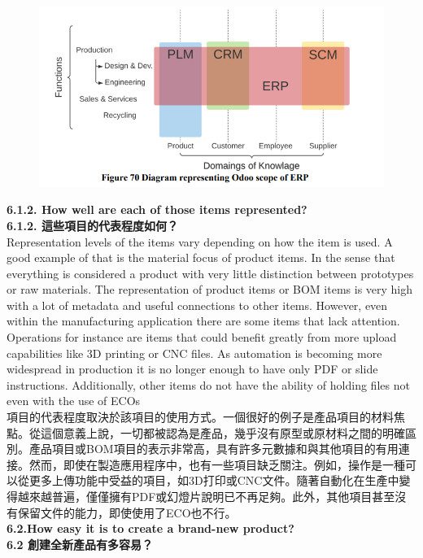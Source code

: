 \documentclass[12pt,a4paper]{report}  %
\begin{document}
\begin{figure}[htbp]
  \centering
  \includegraphics[]{image/601.png}
  \label{fig:601}
\end{figure}
    
\Large\textbf{6.1.2. How well are each of those items represented?}\\
\Large\textbf{6.1.2. 這些項目的代表程度如何？}\\

Representation levels of the items vary depending on how the item is used. A good 
example of that is the material focus of product items. In the sense that everything is 
considered a product with very little distinction between prototypes or raw materials. The 
representation of product items or BOM items is very high with a lot of metadata and useful 
connections to other items. However, even within the manufacturing application there are 
some items that lack attention. Operations for instance are items that could benefit greatly 
from more upload capabilities like 3D printing or CNC files. As automation is becoming 
more widespread in production it is no longer enough to have only PDF or slide instructions.
Additionally, other items do not have the ability of holding files not even with the use of 
ECOs\\
項目的代表程度取決於該項目的使用方式。一個很好的例子是產品項目的材料焦點。從這個意義上說，一切都被認為是產品，幾乎沒有原型或原材料之間的明確區別。產品項目或BOM項目的表示非常高，具有許多元數據和與其他項目的有用連接。然而，即使在製造應用程序中，也有一些項目缺乏關注。例如，操作是一種可以從更多上傳功能中受益的項目，如3D打印或CNC文件。隨著自動化在生產中變得越來越普遍，僅僅擁有PDF或幻燈片說明已不再足夠。此外，其他項目甚至沒有保留文件的能力，即使使用了ECO也不行。\\

\Large\textbf{6.2.How easy it is to create a brand-new product?}\\
\Large\textbf{6.2 創建全新產品有多容易？}\\
\end{document}
